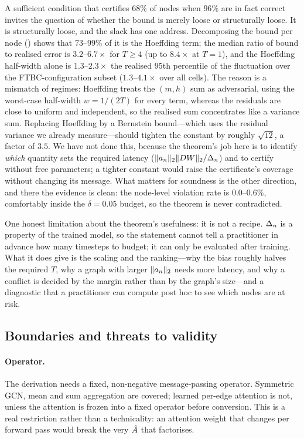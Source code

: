 A sufficient condition that certifies $68\%$ of nodes when $96\%$ are in fact correct invites the
question of whether the bound is merely loose or structurally loose. It is structurally loose, and
the slack has one address. Decomposing the bound per node () shows that
$73$--$99\%$ of it is the Hoeffding term; the median ratio of bound to realised error is
$3.2$--$6.7\times$ for $T \ge 4$ (up to $8.4\times$ at $T=1$), and the Hoeffding half-width alone is
$1.3$--$2.3\times$ the realised 95th percentile of the fluctuation over the FTBC-configuration
subset ($1.3$--$4.1\times$ over all cells). The reason is a mismatch of
regimes: Hoeffding treats the $(m,h)$ sum as adversarial, using the worst-case half-width
$w = 1/(2T)$ for every term, whereas the residuals are close to uniform and independent, so the
realised sum concentrates like a variance sum. Replacing Hoeffding by a Bernstein bound---which uses
the residual variance we already measure---should tighten the constant by roughly $\sqrt{12}$, a
factor of $3.5$. We have not done this, because the theorem's job here is to identify \emph{which}
quantity sets the required latency ($\lVert a_{n}\rVert_{2}\lVert DW\rVert_{2}/\Delta_{n}$) and to certify without free
parameters; a tighter constant would raise the certificate's coverage without changing its message.
What matters for soundness is the other direction, and there the evidence is clean: the node-level
violation rate is $0.0$--$0.6\%$, comfortably inside the $\delta = 0.05$ budget, so the theorem is
never contradicted.

One honest limitation about the theorem's usefulness: it is not a recipe. $\Delta_{n}$ is a property of
the trained model, so the statement cannot tell a practitioner in advance how many timesteps to
budget; it can only be evaluated after training. What it does give is the scaling and the ranking---why
the bias roughly halves the required $T$, why a graph with larger $\lVert a_{n}\rVert_{2}$ needs more latency, and
why a conflict is decided by the margin rather than by the graph's size---and a diagnostic that a
practitioner can compute post hoc to see which nodes are at risk.

\subsection{Boundaries and threats to validity}
\label{sec:boundaries}

\paragraph{Operator.} The derivation needs a fixed, non-negative message-passing operator. Symmetric
GCN, mean and sum aggregation are covered; learned per-edge attention is not, unless the attention is
frozen into a fixed operator before conversion. This is a real restriction rather than a
technicality: an attention weight that changes per forward pass would break the very $\hat{A}$ that
 factorises.

